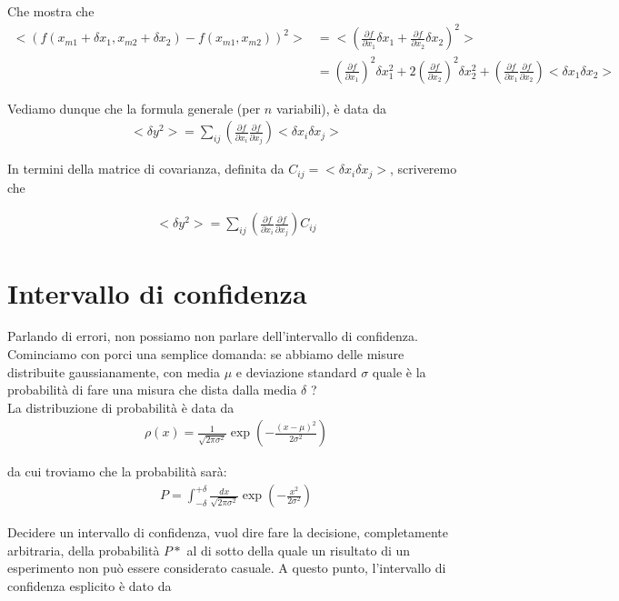 \documentclass{report}
\begin{document}
Che mostra che 
\begin{align}
    <(f(x_{m1}+\delta x_1, x_{m2}+\delta x_2) - f(x_{m1}, x_{m2}))^2 > &= <\left(\frac{\partial f}{\partial x_1}\delta x_1 + \frac{\partial f}{\partial x_2}\delta x_2\right)^2> \\
    &= \left(\frac{\partial f}{\partial x_1} \right)^2\delta x_1^2 + 2\left(\frac{\partial f}{\partial x_2} \right)^2 \delta x_2^2 +\left(\frac{\partial f}{\partial x_1} \frac{\partial f}{\partial x_2}\right)<\delta x_1 \delta x_2>
\end{align}

Vediamo dunque che la formula generale (per \(n\) variabili), è data da 
\begin{align}
    <\delta y^2> = \sum_{ij} \left(\frac{\partial f}{\partial x_i}\frac{\partial f}{\partial x_j}\right)<\delta x_i \delta x_j>
\end{align}

In termini della matrice di covarianza, definita da \(C_{ij} = <\delta x_i \delta x_j >\), scriveremo che 

\begin{align}
    <\delta y^2> = \sum_{ij} \left(\frac{\partial f}{\partial x_i}\frac{\partial f}{\partial x_j}\right) C_{ij}
\end{align}

\section{Intervallo di confidenza}

Parlando di errori, non possiamo non parlare dell'intervallo di confidenza. Cominciamo con porci una semplice domanda: se abbiamo delle misure distribuite gaussianamente, con media \(\mu\) e deviazione standard \(\sigma\) quale è la probabilità di fare una misura che dista dalla media \(\delta\) ? \\

La distribuzione di probabilità è data da 
\begin{align}
    \rho(x) = \frac{1}{\sqrt{2\pi\sigma^2}}\exp\left(-\frac{(x-\mu)^2}{2\sigma^2}\right)
\end{align}

da cui troviamo che la probabilità sarà: 
\begin{align}
    P = \int_{-\delta}^{+\delta}\frac{dx}{\sqrt{2\pi\sigma^2}}\exp\left(-\frac{x^2}{2\sigma^2}\right)
\end{align}

Decidere un intervallo di confidenza, vuol dire fare la decisione, completamente arbitraria, della probabilità \(P*\) al di sotto della quale un risultato di un esperimento non può essere considerato casuale. A questo punto, l'intervallo di confidenza esplicito è dato da 
\end{document}
